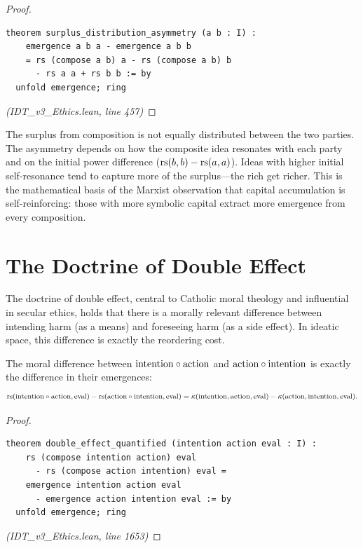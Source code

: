 \begin{proof}
\begin{lstlisting}
theorem surplus_distribution_asymmetry (a b : I) :
    emergence a b a - emergence a b b
    = rs (compose a b) a - rs (compose a b) b
      - rs a a + rs b b := by
  unfold emergence; ring
\end{lstlisting}
\textit{(IDT\_v3\_Ethics.lean, line 457)}
\end{proof}

\begin{interpretation}
The surplus from composition is not equally distributed between the two parties.
The asymmetry depends on how the composite idea resonates with each party and
on the initial power difference ($\mathrm{rs}(b,b) - \mathrm{rs}(a,a)$). Ideas with higher
initial self-resonance tend to capture more of the surplus---the rich get
richer. This is the mathematical basis of the Marxist observation that
capital accumulation is self-reinforcing: those with more symbolic capital
extract more emergence from every composition.
\end{interpretation}

\section{The Doctrine of Double Effect}
\label{sec:double-effect}

The doctrine of double effect, central to Catholic moral theology and
influential in secular ethics, holds that there is a morally relevant
difference between intending harm (as a means) and foreseeing harm (as a
side effect). In ideatic space, this difference is exactly the reordering
cost.

\begin{theorem}
\label{thm:double-effect}
The moral difference between $\mathrm{intention} \circ \mathrm{action}$
and $\mathrm{action} \circ \mathrm{intention}$ is exactly the difference
in their emergences:
\[
  \mathrm{rs}(\mathrm{intention} \circ \mathrm{action}, \mathrm{eval})
  - \mathrm{rs}(\mathrm{action} \circ \mathrm{intention}, \mathrm{eval})
  = \kappa(\mathrm{intention}, \mathrm{action}, \mathrm{eval})
  - \kappa(\mathrm{action}, \mathrm{intention}, \mathrm{eval}).
\]
\end{theorem}

\begin{proof}
\begin{lstlisting}
theorem double_effect_quantified (intention action eval : I) :
    rs (compose intention action) eval
      - rs (compose action intention) eval =
    emergence intention action eval
      - emergence action intention eval := by
  unfold emergence; ring
\end{lstlisting}
\textit{(IDT\_v3\_Ethics.lean, line 1653)}
\end{proof}


